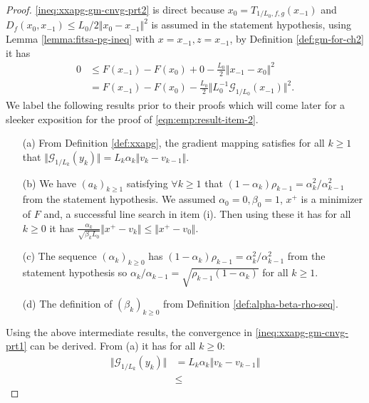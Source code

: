 \documentclass[12pt]{report}
\begin{document}
        \begin{proof}
            \eqref{ineq:xxapg-gm-cnvg-prt2} is direct because $x_0 = T_{1/L_0, f, g}(x_{-1})$ and \mbox{$D_f(x_{0}, x_{-1}) \le L_0/2\Vert x_{0} - x_{-1}\Vert^2$} is assumed in the statement hypothesis, using Lemma \ref{lemma:fitsa-pg-ineq} with $x = x_{-1}, z = x_{-1}$, by Definition \ref{def:gm-for-ch2} it has 
            \begin{align*}
                0 &\le F(x_{-1}) - F(x_0) + 0 - \frac{L_0}{2} \Vert x_{-1} - x_0\Vert^2
                \\
                &= F(x_{-1}) - F(x_0) - \frac{L_0}{2}\Vert L_0^{-1}\mathcal G_{1/L_0}(x_{-1})\Vert^2. 
            \end{align*}
            We label the following results prior to their proofs which will come later for a sleeker exposition for the proof of \eqref{eqn:emp:result-item-2}. 
            \begin{enumerate}
                \item[(a)] From Definition \ref{def:xxapg}, the gradient mapping satisfies for all $k \ge 1$ that $\Vert \mathcal G_{1/L_k} (y_k)\Vert = L_k\alpha_k \Vert v_k - v_{k - 1}\Vert$.
                \item[(b)] We have $(a_k)_{k \ge 1}$ satisfying $\forall k \ge 1$ that $(1 - \alpha_k)\rho_{k - 1} = \alpha_k^2/\alpha_{k - 1}^2$ from the statement hypothesis. We assumed $\alpha_0 = 0, \beta_0 = 1$, $x^+$ is a minimizer of $F$ and, a successful line search in item (i). Then using these it has for all $k \ge 0$ it has $\frac{\alpha_k}{\sqrt{\beta_k L_0}}\Vert x^+ - v_k\Vert \le \Vert x^+ - v_0\Vert$. 
                \item[(c)] The sequence $(\alpha_k)_{k \ge 0}$ has $(1 - \alpha_k)\rho_{k - 1} = \alpha_k^2/\alpha_{k - 1}^2$ from the statement hypothesis so $\alpha_k/\alpha_{k - 1} = \sqrt{\rho_{k - 1}(1 - \alpha_k)}$ for all $k \ge 1$. 
                \item[(d)] The definition of $(\beta_k)_{k \ge 0}$ from Definition \ref{def:alpha-beta-rho-seq}. 
            \end{enumerate}
            Using the above intermediate results, the convergence in \eqref{ineq:xxapg-gm-cnvg-prt1} can be derived. 
            From (a) it has for all $k \ge 0$: 
            \begin{align*}
                \Vert \mathcal G_{1/L_k} (y_k)\Vert 
                &= L_k\alpha_k \Vert v_k - v_{k - 1}\Vert
                \\
                &\le 

\end{align*}
\end{proof}
\end{document}
